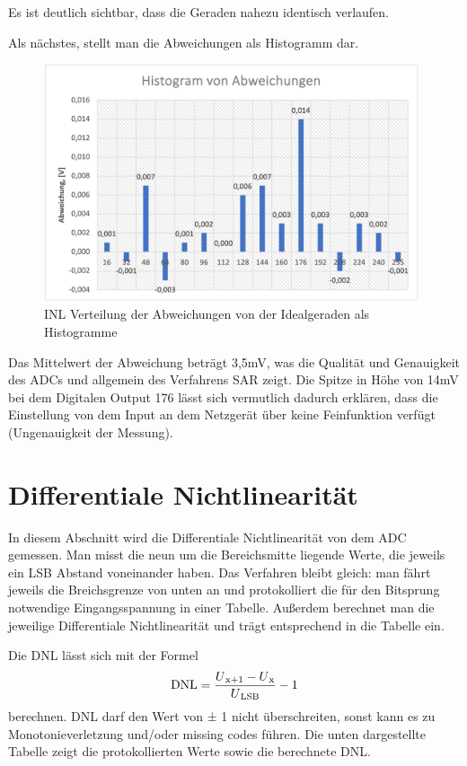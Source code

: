Es ist deutlich sichtbar, dass die Geraden nahezu identisch verlaufen.\par

Als nächstes, stellt man die Abweichungen als Histogramm dar. 

\begin{figure}[H]
	\centering
	\includegraphics[height=7cm]{images/Histogramm_versuch1.png} 
	\caption{\acs{INL} Verteilung der Abweichungen von der
	Idealgeraden als Histogramme}
	\label{fig: INL Verteilung der Abweichungen von der
	Idealgeraden als Histogramme}
\end{figure}

Das Mittelwert der Abweichung beträgt 3,5mV, was die Qualität und Genauigkeit
des \acs{ADC}s und allgemein des Verfahrens \acs{SAR} zeigt.
Die Spitze in Höhe von 14mV bei dem Digitalen Output 176 lässt sich vermutlich 
dadurch erklären, dass die Einstellung von dem Input an dem Netzgerät über keine 
Feinfunktion verfügt (Ungenauigkeit der Messung).

\section{Differentiale Nichtlinearität}
In diesem Abschnitt wird die Differentiale Nichtlinearität von dem ADC gemessen.
Man misst die neun um die Bereichsmitte liegende Werte, die jeweils ein LSB Abstand
voneinander haben. Das Verfahren bleibt gleich: man fährt jeweils die Breichsgrenze 
von unten an und protokolliert die für den Bitsprung notwendige Eingangsspannung in 
einer Tabelle. Außerdem berechnet man die jeweilige Differentiale Nichtlinearität und
trägt entsprechend in die Tabelle ein.

Die \acs{DNL} lässt sich mit der Formel 
\[
\text{DNL} = \frac{U\textsubscript{x+1} - U\textsubscript{x}}{U\textsubscript{LSB}} - 1
\]
berechnen. \acs{DNL} darf den Wert von ± 1 nicht überschreiten, sonst kann es zu 
Monotonieverletzung und/oder missing codes führen. Die unten dargestellte Tabelle
zeigt die protokollierten Werte sowie die berechnete DNL.

